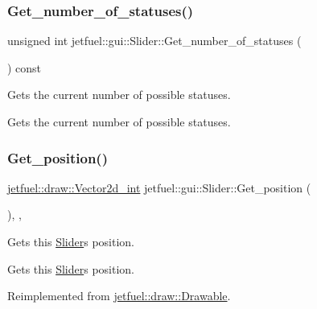 \subsubsection{\texorpdfstring{Get\+\_\+number\+\_\+of\+\_\+statuses()}{Get\_number\_of\_statuses()}}
{\footnotesize\ttfamily unsigned int jetfuel\+::gui\+::\+Slider\+::\+Get\+\_\+number\+\_\+of\+\_\+statuses (\begin{DoxyParamCaption}{ }\end{DoxyParamCaption}) const\hspace{0.3cm}{\ttfamily [inline]}}



Gets the current number of possible statuses. 

Gets the current number of possible statuses. \mbox{\label{classjetfuel_1_1gui_1_1Slider_a2b177c832a42ad21ca1fa88496ef7551}} 
\subsubsection{\texorpdfstring{Get\+\_\+position()}{Get\_position()}}
{\footnotesize\ttfamily \hyperlink{classjetfuel_1_1draw_1_1Vector2d}{jetfuel\+::draw\+::\+Vector2d\+\_\+int} jetfuel\+::gui\+::\+Slider\+::\+Get\+\_\+position (\begin{DoxyParamCaption}{ }\end{DoxyParamCaption})\hspace{0.3cm}{\ttfamily [inline]}, {\ttfamily [override]}, {\ttfamily [virtual]}}



Gets this \hyperlink{classjetfuel_1_1gui_1_1Slider}{Slider}\textquotesingle{}s position. 

Gets this \hyperlink{classjetfuel_1_1gui_1_1Slider}{Slider}\textquotesingle{}s position. 

Reimplemented from \hyperlink{classjetfuel_1_1draw_1_1Drawable_ae7ebd30d66db2c8a5d5371cbcf0023fc}{jetfuel\+::draw\+::\+Drawable}.

\mbox{\label{classjetfuel_1_1gui_1_1Slider_abab31dbe01b716b4e82919f0d8aba96c}} 
